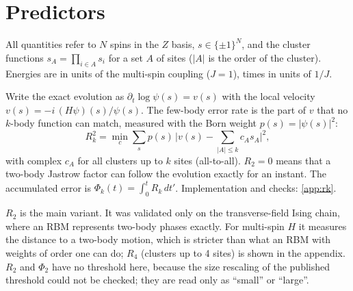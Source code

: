 \documentclass[11pt,a4paper]{article}
\begin{document}
\section{Predictors}
\label{sec:defs}
All quantities refer to $N$ spins in the $Z$ basis, $s\in\lbrace\pm1\rbrace^N$, and the cluster functions
$s_A=\prod_{i\in A}s_i$ for a set $A$ of sites ($\lvert A\rvert$ is the order of the cluster). Energies are in units
of the multi-spin coupling ($J=1$), times in units of $1/J$.

\begin{definition}
Write the exact evolution as $\partial_t\log\psi(s)=v(s)$ with the local velocity $v(s)=-i\,(H\psi)(s)/\psi(s)$.
The few-body error rate is the part of $v$ that no $k$-body function can match, measured with the Born weight
$p(s)=\lvert\psi(s)\rvert^2$:
\[
  R_k^2=\min_{c}\sum_s p(s)\,\Big\lvert v(s)-\sum_{\lvert A\rvert\le k}c_As_A\Big\rvert^2 ,
\]
with complex $c_A$ for all clusters up to $k$ sites (all-to-all). $R_2=0$ means that a two-body Jastrow factor can
follow the evolution exactly for an instant. The accumulated error is $\Phi_k(t)=\int_0^tR_k\,dt'$. Implementation and
checks: \cref{app:rk}.
\end{definition}

$R_2$ is the main variant. It was validated only on the transverse-field Ising chain, where an RBM represents two-body
phases exactly. For multi-spin $H$ it measures the distance to a two-body motion, which is stricter than what an RBM
with weights of order one can do; $R_4$ (clusters up to 4 sites) is shown in the appendix. $R_2$ and $\Phi_2$ have
no threshold here, because the size rescaling of the published threshold could not be checked; they are read only
as ``small'' or ``large''.
\end{document}

